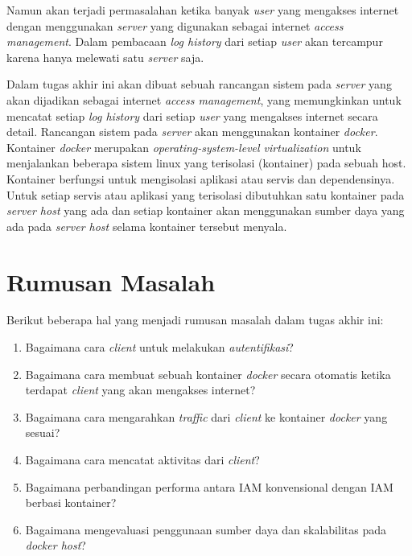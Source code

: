 Namun akan terjadi permasalahan ketika banyak \textit{user} yang mengakses internet dengan menggunakan \textit{server} yang digunakan sebagai internet \textit{access management}. Dalam pembacaan \textit{log history} dari setiap \textit{user} akan tercampur karena hanya melewati satu \textit{server} saja. 

Dalam tugas akhir ini akan dibuat sebuah rancangan sistem pada \textit{server} yang akan dijadikan sebagai internet \textit{access management}, yang memungkinkan untuk mencatat setiap \textit{log history} dari setiap \textit{user} yang mengakses internet secara detail. Rancangan sistem pada \textit{server} akan menggunakan kontainer \textit{docker}. Kontainer \textit{docker} merupakan \textit{operating-system-level virtualization} untuk menjalankan beberapa sistem linux yang terisolasi (kontainer) pada sebuah host. Kontainer berfungsi untuk mengisolasi aplikasi atau servis dan dependensinya. Untuk setiap servis atau aplikasi yang terisolasi dibutuhkan satu kontainer pada \textit{server host} yang ada dan setiap kontainer akan menggunakan sumber daya yang ada pada \textit{server host} selama kontainer tersebut menyala.

\section{Rumusan Masalah}
Berikut beberapa hal yang menjadi rumusan masalah dalam tugas akhir ini:
\begin{enumerate}
	\item Bagaimana cara \textit{client} untuk melakukan \textit{autentifikasi}?
	\item Bagaimana cara membuat sebuah kontainer \textit{docker} secara otomatis ketika terdapat \textit{client} yang akan mengakses internet?
	\item Bagaimana cara mengarahkan \textit{traffic} dari \textit{client} ke kontainer \textit{docker} yang sesuai?
	\item Bagaimana cara mencatat aktivitas dari \textit{client}?
	\item Bagaimana perbandingan performa antara IAM konvensional dengan IAM berbasi kontainer?
	\item Bagaimana mengevaluasi penggunaan sumber daya dan skalabilitas pada \textit{docker host}?
\end{enumerate}

